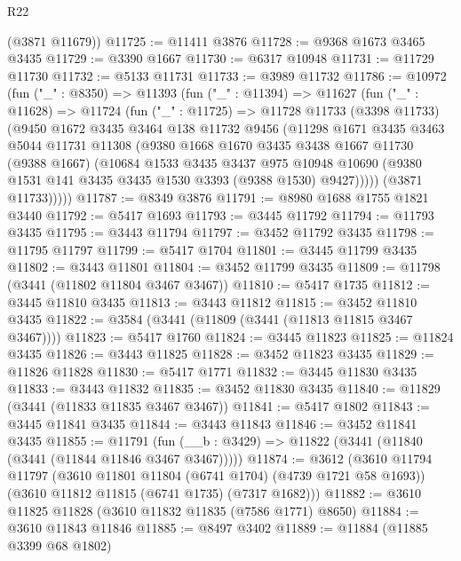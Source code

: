 \begin{lexlean}{R22}
\begin{coremodule}
      (@3871 @11679))
@11725 := @11411 @3876
@11728 := @9368 @1673 @3465 @3435
@11729 := @3390 @1667
@11730 := @6317 @10948
@11731 := @11729 @11730
@11732 := @5133 @11731
@11733 := @3989 @11732
@11786 := @10972
    (fun ("_" : @8350) =>
    @11393
      (fun ("_" : @11394) =>
      @11627
        (fun ("_" : @11628) =>
        @11724
          (fun ("_" : @11725) =>
          @11728
            @11733
            (@3398 @11733)
            (@9450
              @1672
              @3435
              @3464
              @138
              @11732
              @9456
              (@11298
                @1671
                @3435
                @3463
                @5044
                @11731
                @11308
                (@9380
                  @1668
                  @1670
                  @3435
                  @3438
                  @1667
                  @11730
                  (@9388 @1667)
                  (@10684
                    @1533
                    @3435
                    @3437
                    @975
                    @10948
                    @10690
                    (@9380 @1531 @141 @3435 @3435 @1530 @3393 (@9388 @1530) @9427)))))
            (@3871 @11733)))))
@11787 := @8349 @3876
@11791 := @8980 @1688 @1755 @1821 @3440
@11792 := @5417 @1693
@11793 := @3445 @11792
@11794 := @11793 @3435
@11795 := @3443 @11794
@11797 := @3452 @11792 @3435
@11798 := @11795 @11797
@11799 := @5417 @1704
@11801 := @3445 @11799 @3435
@11802 := @3443 @11801
@11804 := @3452 @11799 @3435
@11809 := @11798 (@3441 (@11802 @11804 @3467 @3467))
@11810 := @5417 @1735
@11812 := @3445 @11810 @3435
@11813 := @3443 @11812
@11815 := @3452 @11810 @3435
@11822 := @3584 (@3441 (@11809 (@3441 (@11813 @11815 @3467 @3467))))
@11823 := @5417 @1760
@11824 := @3445 @11823
@11825 := @11824 @3435
@11826 := @3443 @11825
@11828 := @3452 @11823 @3435
@11829 := @11826 @11828
@11830 := @5417 @1771
@11832 := @3445 @11830 @3435
@11833 := @3443 @11832
@11835 := @3452 @11830 @3435
@11840 := @11829 (@3441 (@11833 @11835 @3467 @3467))
@11841 := @5417 @1802
@11843 := @3445 @11841 @3435
@11844 := @3443 @11843
@11846 := @3452 @11841 @3435
@11855 := @11791 (fun (__b : @3429) => @11822 (@3441 (@11840 (@3441 (@11844 @11846 @3467 @3467)))))
@11874 := @3612
    (@3610
      @11794
      @11797
      (@3610 @11801 @11804 (@6741 @1704) (@4739 @1721 @58 @1693))
      (@3610 @11812 @11815 (@6741 @1735) (@7317 @1682)))
@11882 := @3610 @11825 @11828 (@3610 @11832 @11835 (@7586 @1771) @8650)
@11884 := @3610 @11843 @11846
@11885 := @8497 @3402
@11889 := @11884 (@11885 @3399 @68 @1802)

\end{coremodule}
\end{lexlean}
